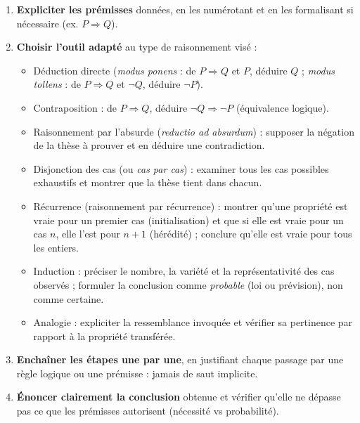 \documentclass[11pt]{article}
\newcommand{\cle}[1]{{\popxbold\color{popdark}#1}}
\begin{document}
\begin{methode}
\begin{enumerate}
\item \textbf{Expliciter les prémisses} données, en les numérotant et en les formalisant si nécessaire (ex. $P \Rightarrow Q$).
\item \textbf{Choisir l'outil adapté} au type de raisonnement visé :
      \begin{itemize}
      \item \cle{Déduction directe} (\textit{modus ponens} : de $P \Rightarrow Q$ et $P$, déduire $Q$ ; \textit{modus tollens} : de $P \Rightarrow Q$ et $\neg Q$, déduire $\neg P$).
      \item \cle{Contraposition} : de $P \Rightarrow Q$, déduire $\neg Q \Rightarrow \neg P$ (équivalence logique).
      \item \cle{Raisonnement par l'absurde} (\textit{reductio ad absurdum}) : supposer la négation de la thèse à prouver et en déduire une contradiction.
      \item \cle{Disjonction des cas} (ou \textit{cas par cas}) : examiner tous les cas possibles exhaustifs et montrer que la thèse tient dans chacun.
      \item \cle{Récurrence} (raisonnement par récurrence) : montrer qu'une propriété est vraie pour un premier cas (initialisation) et que si elle est vraie pour un cas $n$, elle l'est pour $n+1$ (hérédité) ; conclure qu'elle est vraie pour tous les entiers.
      \item \cle{Induction} : préciser le nombre, la variété et la représentativité des cas observés ; formuler la conclusion comme \emph{probable} (loi ou prévision), non comme certaine.
      \item \cle{Analogie} : expliciter la ressemblance invoquée et vérifier sa pertinence par rapport à la propriété transférée.
      \end{itemize}
\item \textbf{Enchaîner les étapes une par une}, en justifiant chaque passage par une règle logique ou une prémisse : jamais de saut implicite.
\item \textbf{Énoncer clairement la conclusion} obtenue et vérifier qu'elle ne dépasse pas ce que les prémisses autorisent (nécessité vs probabilité).
\end{enumerate}
\end{methode}
\end{document}
